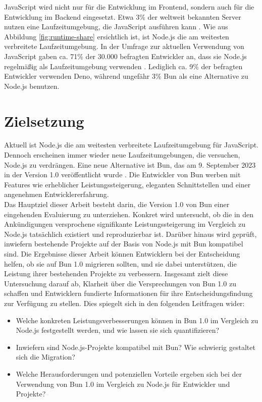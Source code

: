 \noindent
JavaScript wird nicht nur für die Entwicklung im Frontend, sondern auch für die Entwicklung im Backend 
eingesetzt. Etwa 3\% der weltweit bekannten Server nutzen eine Laufzeitumgebung, die JavaScript 
ausführen kann \cite{QSuccess.2023}. Wie aus Abbildung \ref{fig:runtime-share} ersichtlich ist, ist Node.js die am weitesten verbreitete Laufzeitumgebung. In der Umfrage zur aktuellen Verwendung von JavaScript gaben ca. 71\% der 30.000 befragten Entwickler an, dass sie Node.js regelmäßig als Laufzeitumgebung verwenden \cite{Greif.2022}.
Lediglich ca. 9\% der befragten Entwickler verwenden Deno, während ungefähr 3\% Bun als eine Alternative zu Node.js benutzen.


\section{Zielsetzung} \label{sec:introduction-target}
Aktuell ist Node.js die am weitesten verbreitete Laufzeitumgebung für JavaScript. Dennoch erscheinen immer wieder neue Laufzeitumgebungen, die versuchen, Node.js zu verdrängen. Eine neue Alternative ist Bun, das am 9. September 2023 in der Version 1.0 veröffentlicht wurde \cite{Sumner.2023b}. Die Entwickler von Bun werben mit Features wie erheblicher Leistungssteigerung, eleganten Schnittstellen und einer angenehmen Entwicklererfahrung.\\

\noindent
Das Hauptziel dieser Arbeit besteht darin, die Version 1.0 von Bun einer eingehenden Evaluierung zu unterziehen. Konkret wird untersucht, ob die in den Ankündigungen versprochene signifikante Leistungssteigerung im Vergleich zu Node.js tatsächlich existiert und reproduzierbar ist. Darüber hinaus wird geprüft, inwiefern bestehende Projekte auf der Basis von Node.js mit Bun kompatibel sind. Die Ergebnisse dieser Arbeit können Entwicklern bei der Entscheidung helfen, ob sie auf Bun 1.0 migrieren sollten, und sie dabei unterstützen, die Leistung ihrer bestehenden Projekte zu verbessern. Insgesamt zielt diese Untersuchung darauf ab, Klarheit über die Versprechungen von Bun 1.0 zu schaffen und Entwicklern fundierte Informationen für ihre Entscheidungsfindung zur Verfügung zu stellen. Dies spiegelt sich in den folgenden Leitfragen wider:
\begin{itemize}
    \item Welche konkreten Leistungsverbesserungen können in Bun 1.0 im Vergleich zu Node.js festgestellt werden, und wie lassen sie sich quantifizieren?
    \item Inwiefern sind Node.js-Projekte kompatibel mit Bun? Wie schwierig gestaltet sich die Migration?
    \item Welche Herausforderungen und potenziellen Vorteile ergeben sich bei der Verwendung von Bun 1.0 im Vergleich zu Node.js für Entwickler und Projekte?
\end{itemize}

